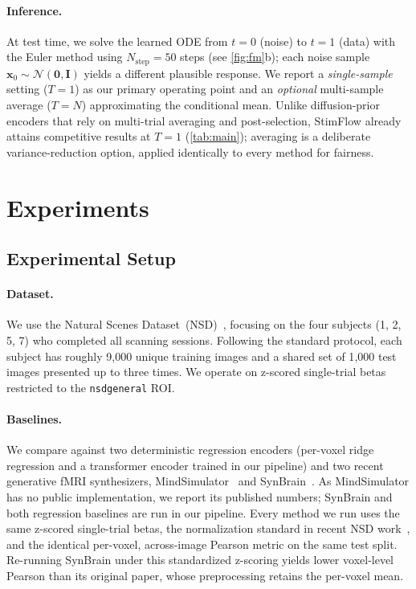 \documentclass[runningheads]{llncs}
\begin{document}
\paragraph{Inference.}
At test time, we solve the learned ODE from $t = 0$ (noise) to $t = 1$ (data) with the Euler
method using $N_{\text{step}} = 50$ steps (see \cref{fig:fm}b); each noise sample
$\mathbf{x}_0 \sim \mathcal{N}(\mathbf{0}, \mathbf{I})$ yields a different plausible response.
We report a \emph{single-sample} setting ($T{=}1$) as our primary operating point and an
\emph{optional} multi-sample average ($T{=}N$) approximating the conditional mean. Unlike
diffusion-prior encoders that rely on multi-trial averaging and post-selection, StimFlow
already attains competitive results at $T{=}1$ (\cref{tab:main}); averaging is a deliberate
variance-reduction option, applied identically to every method for fairness.


\enlargethispage{2\baselineskip}\section{Experiments}
\label{sec:exp}

\subsection{Experimental Setup}
\label{sec:exp-setup}

\paragraph{Dataset.}
We use the Natural Scenes Dataset~(NSD)~\cite{nsd}, focusing on the four subjects
(1, 2, 5, 7) who completed all scanning sessions.
Following the standard protocol, each subject has roughly 9{,}000 unique training
images and a shared set of 1{,}000 test images presented up to three times.
We operate on z-scored single-trial betas restricted to the \texttt{nsdgeneral} ROI.

\paragraph{Baselines.}
We compare against two deterministic regression encoders (per-voxel ridge regression and a
transformer encoder trained in our pipeline) and two recent generative fMRI synthesizers,
MindSimulator~\cite{mindsimulator} and SynBrain~\cite{synbrain}. As MindSimulator has no public
implementation, we report its published numbers; SynBrain and both regression baselines are run
in our pipeline. Every method we run uses the same z-scored single-trial betas, the
normalization standard in recent NSD work~\cite{mindsimulator,mindeye2}, and the identical
per-voxel, across-image Pearson metric on the same test split. Re-running SynBrain under this
standardized z-scoring yields lower voxel-level Pearson than its original paper, whose
preprocessing retains the per-voxel mean.
\end{document}
